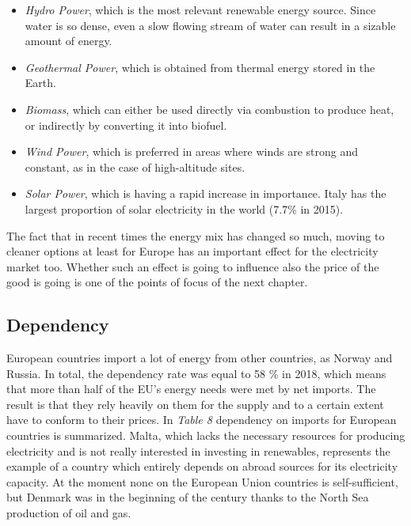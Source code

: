 \documentclass{book}
\begin{document}
\begin{itemize}
\item \textit{Hydro Power}, which is the most relevant renewable energy source. Since water is so dense, even a slow flowing stream of water can result in a sizable amount of energy.
\item \textit{Geothermal Power}, which is obtained from thermal energy stored in the Earth.
\item \textit{Biomass}, which can either be used directly via combustion to produce heat, or indirectly by converting it into biofuel.
\item \textit{Wind Power}, which is preferred in areas where winds are strong and constant, as in the case of high-altitude sites.
\item \textit{Solar Power}, which is having a rapid increase in importance. Italy has the largest proportion of solar electricity in the world (7.7\% in 2015).
\end{itemize}

The fact that in recent times the energy mix has changed so much, moving to cleaner options at least for Europe has an important effect for the electricity market too. Whether such an effect is going to influence also the price of the good is going is one of the points of focus of the next chapter.

\subsection*{Dependency}

European countries import a lot of energy from other countries, as Norway and Russia. In total, the dependency rate was equal to 58 \% in 2018, which means that more than half of the EU’s energy needs were met by net imports. The result is that they rely heavily on them for the supply and to a certain extent have to conform to their prices. In \textit{Table 8} dependency on imports for European countries is summarized. Malta, which lacks the necessary resources for producing electricity and is not really interested in investing in renewables, represents the example of a country which entirely depends on abroad sources for its electricity capacity. At the moment none on the European Union countries is self-sufficient, but Denmark was in the beginning of the century thanks to the North Sea production of oil and gas.
\end{document}
